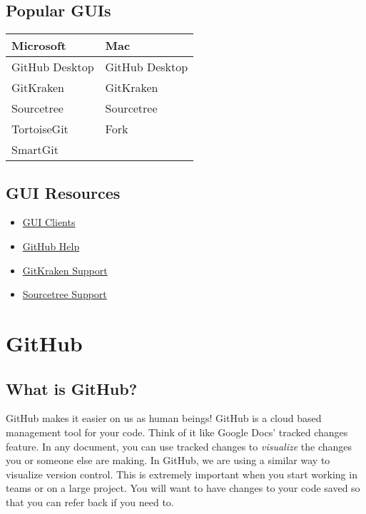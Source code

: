 \documentclass[
]{article}
\providecommand{\tightlist}{%
  \setlength{\itemsep}{0pt}\setlength{\parskip}{0pt}}
\begin{document}
\hypertarget{popular-guis}{%
\subsection{Popular GUIs}\label{popular-guis}}

\begin{longtable}[]{@{}ll@{}}
\toprule
Microsoft & Mac \\
\midrule
\endhead
GitHub Desktop & GitHub Desktop \\
GitKraken & GitKraken \\
Sourcetree & Sourcetree \\
TortoiseGit & Fork \\
SmartGit & \\
\bottomrule
\end{longtable}

\hypertarget{gui-resources}{%
\subsection{GUI Resources}\label{gui-resources}}

\begin{itemize}
\tightlist
\item
  \href{https://git-scm.com/downloads/guis}{GUI Clients}
\item
  \href{https://docs.github.com/en}{GitHub Help}
\item
  \href{https://support.gitkraken.com/}{GitKraken Support}
\item
  \href{https://confluence.atlassian.com/get-started-with-sourcetree}{Sourcetree
  Support}
\end{itemize}

\hypertarget{github}{%
\section{GitHub}\label{github}}

\hypertarget{what-is-github}{%
\subsection{What is GitHub?}\label{what-is-github}}

GitHub makes it easier on us as human beings! GitHub is a cloud based
management tool for your code. Think of it like Google Docs' tracked
changes feature. In any document, you can use tracked changes to
\emph{visualize} the changes you or someone else are making. In GitHub,
we are using a similar way to visualize version control. This is
extremely important when you start working in teams or on a large
project. You will want to have changes to your code saved so that you
can refer back if you need to.
\end{document}

